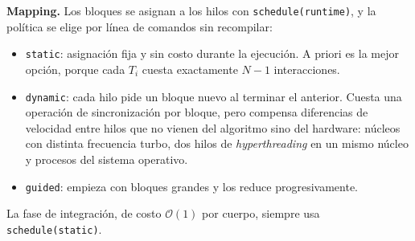 \documentclass[11pt,a4paper]{article}
\begin{document}
\textbf{Mapping.} Los bloques se asignan a los hilos con \texttt{schedule(runtime)}, y la política se elige por línea de comandos sin recompilar:
\begin{itemize}
    \item \texttt{static}: asignación fija y sin costo durante la ejecución. A priori es la mejor opción, porque cada $T_i$ cuesta exactamente $N-1$ interacciones.
    \item \texttt{dynamic}: cada hilo pide un bloque nuevo al terminar el anterior. Cuesta una operación de sincronización por bloque, pero compensa diferencias de velocidad entre hilos que no vienen del algoritmo sino del hardware: núcleos con distinta frecuencia turbo, dos hilos de \textit{hyperthreading} en un mismo núcleo y procesos del sistema operativo.
    \item \texttt{guided}: empieza con bloques grandes y los reduce progresivamente.
\end{itemize}
La fase de integración, de costo $\mathcal{O}(1)$ por cuerpo, siempre usa \texttt{schedule(static)}.

\end{document}

